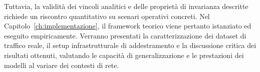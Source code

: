 Tuttavia, la validità dei vincoli analitici e delle proprietà di invarianza descritte richiede un riscontro quantitativo su scenari operativi concreti. 
Nel Capitolo~\ref{ch:implementazione}, il framework teorico viene pertanto istanziato ed eseguito empiricamente. 
Verranno presentati la caratterizzazione dei dataset di traffico reale, il setup infrastrutturale di addestramento e la discussione critica dei risultati ottenuti, valutando le capacità di generalizzazione e le prestazioni dei modelli al variare dei contesti di rete.